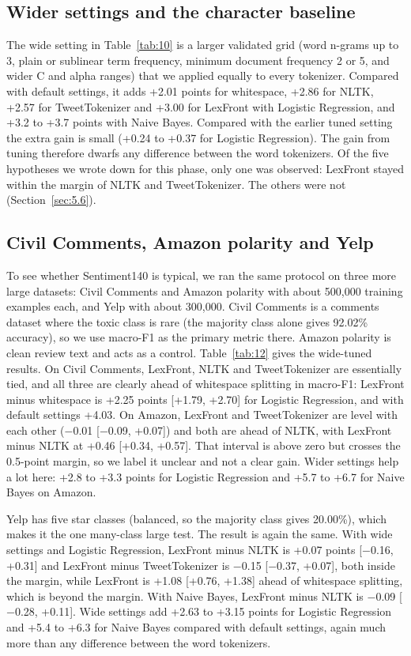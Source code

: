\documentclass[journal,a4paper]{IEEEtran}
\begin{document}
\subsection{Wider settings and the character baseline}\label{sec:4.8}
The wide setting in Table~\ref{tab:10} is a larger validated grid (word n-grams up to 3, plain or sublinear term frequency, minimum document frequency 2 or 5, and wider C and alpha ranges) that we applied equally to every tokenizer. Compared with default settings, it adds +2.01 points for whitespace, +2.86 for NLTK, +2.57 for TweetTokenizer and +3.00 for LexFront with Logistic Regression, and +3.2 to +3.7 points with Naive Bayes. Compared with the earlier tuned setting the extra gain is small (+0.24 to +0.37 for Logistic Regression). The gain from tuning therefore dwarfs any difference between the word tokenizers. Of the five hypotheses we wrote down for this phase, only one was observed: LexFront stayed within the margin of NLTK and TweetTokenizer. The others were not (Section~\ref{sec:5.6}).

\subsection{Civil Comments, Amazon polarity and Yelp}\label{sec:4.9}
To see whether Sentiment140 is typical, we ran the same protocol on three more large datasets: Civil Comments and Amazon polarity with about 500,000 training examples each, and Yelp with about 300,000. Civil Comments is a comments dataset where the toxic class is rare (the majority class alone gives 92.02\% accuracy), so we use macro-F1 as the primary metric there. Amazon polarity is clean review text and acts as a control. Table~\ref{tab:12} gives the wide-tuned results. On Civil Comments, LexFront, NLTK and TweetTokenizer are essentially tied, and all three are clearly ahead of whitespace splitting in macro-F1: LexFront minus whitespace is +2.25 points [+1.79, +2.70] for Logistic Regression, and with default settings +4.03. On Amazon, LexFront and TweetTokenizer are level with each other ($-$0.01 [$-$0.09, +0.07]) and both are ahead of NLTK, with LexFront minus NLTK at +0.46 [+0.34, +0.57]. That interval is above zero but crosses the 0.5-point margin, so we label it unclear and not a clear gain. Wider settings help a lot here: +2.8 to +3.3 points for Logistic Regression and +5.7 to +6.7 for Naive Bayes on Amazon.

Yelp has five star classes (balanced, so the majority class gives 20.00\%), which makes it the one many-class large test. The result is again the same. With wide settings and Logistic Regression, LexFront minus NLTK is +0.07 points [$-$0.16, +0.31] and LexFront minus TweetTokenizer is $-$0.15 [$-$0.37, +0.07], both inside the margin, while LexFront is +1.08 [+0.76, +1.38] ahead of whitespace splitting, which is beyond the margin. With Naive Bayes, LexFront minus NLTK is $-$0.09 [$-$0.28, +0.11]. Wide settings add +2.63 to +3.15 points for Logistic Regression and +5.4 to +6.3 for Naive Bayes compared with default settings, again much more than any difference between the word tokenizers.
\end{document}
